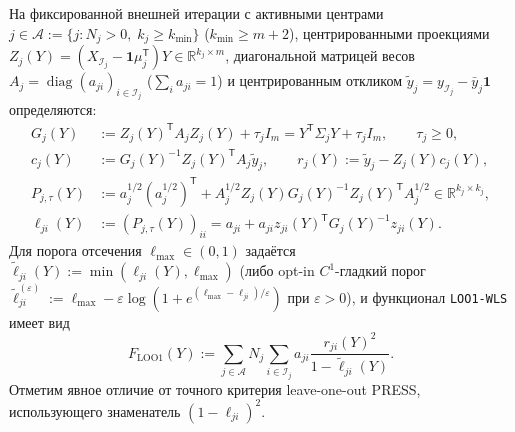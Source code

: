 \documentclass[11pt,a4paper]{article}
\numberwithin{equation}{section}
\theoremstyle{definition}
\theoremstyle{remark}
\newcommand{\R}{\mathbb{R}}
\newcommand{\diag}{\operatorname{diag}}
\newcommand{\T}{^{\mathsf T}}
\begin{document}
На фиксированной внешней итерации с активными центрами $j \in \mathcal{A} := \{j : N_j > 0,\; k_j \ge k_{\min}\}$
($k_{\min} \ge m + 2$), центрированными проекциями $Z_j(Y) = (X_{\mathcal{I}_j} - \mathbf{1}\mu_j\T) Y \in \R^{k_j \times m}$,
диагональной матрицей весов $A_j = \diag(a_{ji})_{i \in \mathcal{I}_j}$ ($\sum_i a_{ji} = 1$)
и центрированным откликом $\tilde{y}_j = y_{\mathcal{I}_j} - \bar{y}_j \mathbf{1}$ определяются:
\begin{align}
  G_j(Y) &:= Z_j(Y)\T A_j Z_j(Y) + \tau_j I_m = Y\T \Sigma_j Y + \tau_j I_m, \qquad \tau_j \ge 0, \label{eq:G}\\
  c_j(Y) &:= G_j(Y)^{-1} Z_j(Y)\T A_j \tilde{y}_j, \qquad
  r_j(Y) := \tilde{y}_j - Z_j(Y) c_j(Y), \label{eq:c-r}\\
  P_{j,\tau}(Y) &:= a_j^{1/2}(a_j^{1/2})\T + A_j^{1/2} Z_j(Y) G_j(Y)^{-1} Z_j(Y)\T A_j^{1/2} \in \R^{k_j \times k_j}, \label{eq:P-hat}\\
  \ell_{ji}(Y) &:= (P_{j,\tau}(Y))_{ii} = a_{ji} + a_{ji} z_{ji}(Y)\T G_j(Y)^{-1} z_{ji}(Y). \label{eq:lev}
\end{align}
Для порога отсечения $\ell_{\max} \in (0, 1)$ задаётся $\tilde\ell_{ji}(Y) := \min(\ell_{ji}(Y), \ell_{\max})$
(либо opt-in $C^1$-гладкий порог $\tilde\ell_{ji}^{(\varepsilon)} := \ell_{\max} - \varepsilon \log(1 + e^{(\ell_{\max}-\ell_{ji})/\varepsilon})$ при $\varepsilon > 0$),
и функционал \texttt{LOO1-WLS} имеет вид
\begin{equation}\label{eq:F-loo1}
  F_{\mathrm{LOO1}}(Y) := \sum_{j \in \mathcal{A}} N_j \sum_{i \in \mathcal{I}_j} a_{ji} \frac{r_{ji}(Y)^2}{1 - \tilde\ell_{ji}(Y)}.
\end{equation}
Отметим явное отличие от точного критерия leave-one-out PRESS, использующего знаменатель $(1 - \ell_{ji})^2$.
\end{document}

